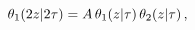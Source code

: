 \[\mathop{\theta_{1}\/}\nolimits\!\left(2z\middle|2\tau\right)=A\mathop{\theta_{%
1}\/}\nolimits\!\left(z\middle|\tau\right)\mathop{\theta_{2}\/}\nolimits\!%
\left(z\middle|\tau\right),\]